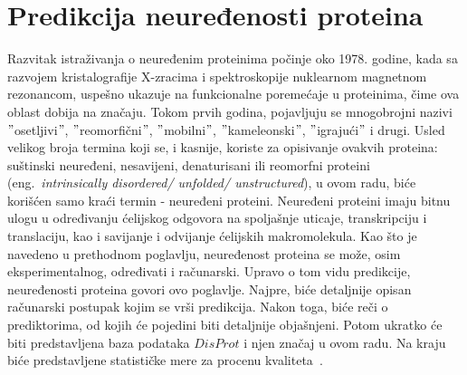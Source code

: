 
\chapter{Predikcija neuređenosti proteina} %
\label{predikcija} %

Razvitak istraživanja o neuređenim proteinima počinje oko 1978. godine, kada sa razvojem kristalografije X-zracima i spektroskopije nuklearnom magnetnom rezonancom, uspešno ukazuje na funkcionalne poremećaje u proteinima, čime ova oblast dobija na značaju. Tokom prvih godina, pojavljuju se mnogobrojni nazivi $"$osetljivi$"$, $"$reomorfični$"$, $"$mobilni$"$, $"$kameleonski$"$, $"$igrajući$"$ i drugi. Usled velikog broja termina koji se, i kasnije, koriste za opisivanje ovakvih proteina: suštinski neuređeni, nesavijeni, denaturisani ili reomorfni proteini (eng.~{\em intrinsically disordered/ unfolded/ unstructured}), u ovom radu, biće korišćen samo kraći termin - neuređeni proteini. 
Neuređeni proteini imaju bitnu ulogu u određivanju ćelijskog odgovora na spoljašnje uticaje, transkripciju i translaciju, kao i savijanje i odvijanje ćelijskih makromolekula.
Kao što je navedeno u prethodnom poglavlju, neuređenost proteina se može, osim eksperimentalnog, određivati i računarski. Upravo o tom vidu predikcije, neuređenosti proteina govori ovo poglavlje. Najpre, biće detaljnije opisan računarski postupak kojim se vrši predikcija. Nakon toga, biće reči o prediktorima, od kojih će pojedini biti detaljnije objašnjeni. Potom ukratko će biti predstavljena baza podataka $DisProt$ i njen značaj u ovom radu. Na kraju biće predstavljene statističke mere za procenu kvaliteta~\cite{JKd, IDPsAtoZ, IDPTompa}.\\\\




